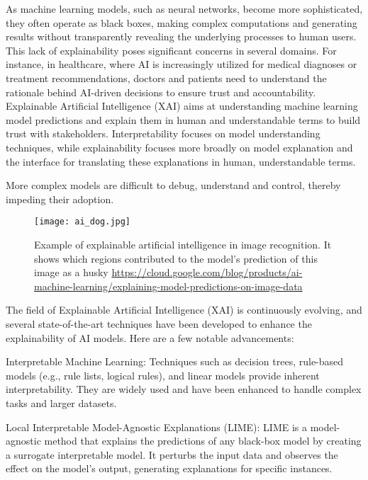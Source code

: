 As machine learning models, such as neural networks, become more sophisticated, they often operate as black boxes, making complex computations and generating results without transparently revealing the underlying processes to human users. This lack of explainability poses significant concerns in several domains. For instance, in healthcare, where AI is increasingly utilized for medical diagnoses or treatment recommendations, doctors and patients need to understand the rationale behind AI-driven decisions to ensure trust and accountability.
Explainable Artificial Intelligence (XAI) aims at understanding machine learning model predictions and explain them in human and understandable terms to build trust with stakeholders.
Interpretability focuses on model understanding techniques, while explainability focuses more broadly on model explanation and the interface for translating these explanations in human, understandable terms.

More complex models are difficult to debug, understand and control, thereby impeding their adoption.

\begin{figure}
    \centering
    \texttt{[image: ai\_dog.jpg]}
    \caption{Example of explainable artificial intelligence in image recognition. It shows which regions contributed to the model's prediction of this image as a husky \url{https://cloud.google.com/blog/products/ai-machine-learning/explaining-model-predictions-on-image-data}}
    \label{fig:ai_dog}
\end{figure}

The field of Explainable Artificial Intelligence (XAI) is continuously evolving, and several state-of-the-art techniques have been developed to enhance the explainability of AI models. Here are a few notable advancements:

Interpretable Machine Learning: Techniques such as decision trees, rule-based models (e.g., rule lists, logical rules), and linear models provide inherent interpretability. They are widely used and have been enhanced to handle complex tasks and larger datasets.

Local Interpretable Model-Agnostic Explanations (LIME): LIME is a model-agnostic method that explains the predictions of any black-box model by creating a surrogate interpretable model. It perturbs the input data and observes the effect on the model's output, generating explanations for specific instances.

